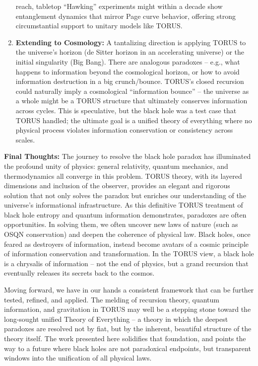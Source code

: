 \documentclass[]{article}
\begin{document}
\begin{enumerate}
  reach, tabletop ``Hawking'' experiments might within a decade show
  entanglement dynamics that mirror Page curve behavior, offering strong
  circumstantial support to unitary models like TORUS.
\item
  \textbf{Extending to Cosmology:} A tantalizing direction is applying
  TORUS to the universe's horizon (de Sitter horizon in an accelerating
  universe) or the initial singularity (Big Bang). There are analogous
  paradoxes -- e.g., what happens to information beyond the cosmological
  horizon, or how to avoid information destruction in a big
  crunch/bounce. TORUS's closed recursion could naturally imply a
  cosmological ``information bounce'' -- the universe as a whole might
  be a TORUS structure that ultimately conserves information across
  cycles. This is speculative, but the black hole was a test case that
  TORUS handled; the ultimate goal is a unified theory of everything
  where no physical process violates information conservation or
  consistency across scales.
\end{enumerate}

\textbf{Final Thoughts:} The journey to resolve the black hole paradox
has illuminated the profound unity of physics: general relativity,
quantum mechanics, and thermodynamics all converge in this problem.
TORUS theory, with its layered dimensions and inclusion of the observer,
provides an elegant and rigorous solution that not only solves the
paradox but enriches our understanding of the universe's informational
infrastructure. As this definitive TORUS treatment of black hole entropy
and quantum information demonstrates, paradoxes are often opportunities.
In solving them, we often uncover new laws of nature (such as OSQN
conservation) and deepen the coherence of physical law. Black holes,
once feared as destroyers of information, instead become avatars of a
cosmic principle of information conservation and transformation. In the
TORUS view, a black hole is a chrysalis of information -- not the end of
physics, but a grand recursion that eventually releases its secrets back
to the cosmos.

Moving forward, we have in our hands a consistent framework that can be
further tested, refined, and applied. The melding of recursion theory,
quantum information, and gravitation in TORUS may well be a stepping
stone toward the long-sought unified Theory of Everything -- a theory in
which the deepest paradoxes are resolved not by fiat, but by the
inherent, beautiful structure of the theory itself. The work presented
here solidifies that foundation, and points the way to a future where
black holes are not paradoxical endpoints, but transparent windows into
the unification of all physical laws.
\end{document}

